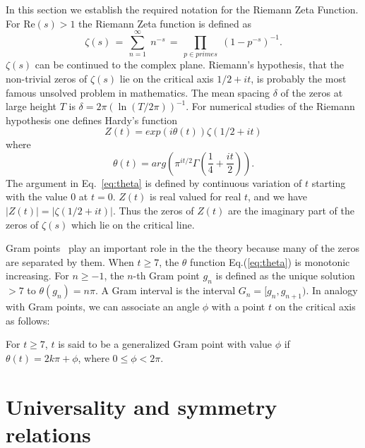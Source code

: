 \documentclass[twoside]{article}
\begin{document}
In this section we  establish the required notation for the 
Riemann Zeta Function. 
For $\mathrm{Re} (s) > 1$ the Riemann Zeta function is defined as
\begin{equation}
\zeta ( s ) \, = \, \sum^{\infty}_{n = 1} \; n^{-s} \, = \, \prod_{p \in primes} \;
\left( 1 - p^{-s} \right)^{-1}.
\label{eqRie}
\end{equation}
 $\zeta ( s )$ can be continued to
the complex plane. Riemann's hypothesis, that the non-trivial zeros of $\zeta ( s )$ lie on the 
critical axis $1/2+it$, is probably the most famous unsolved problem in mathematics.
The mean spacing $\delta$ of the zeros  at large height $T$ is $\delta = 2\pi(\ln (T/2\pi))^{-1}$. 
For numerical studies of the Riemann hypothesis one defines Hardy's function
\begin{equation}
Z(t)=exp(i\theta(t))\zeta(1/2 +it) 
\label{eq:hardy}
\end{equation}
where 
\begin{equation}
\theta(t) = arg (\pi^{it/2} \Gamma(\frac{1}{4} + \frac{it}{2})). 
\label{eq:theta}
\end{equation}
The argument in Eq.~\ref{eq:theta} is defined by continuous variation of $t$ starting with the value $0$ at $t = 0$.
$Z(t)$ is real valued for real $t$,
and we have $|Z(t)| = |\zeta(1/2+it)|$. Thus the zeros of $Z(t)$ are the imaginary part of the zeros 
of $\zeta(s)$ which lie on the critical line.  

Gram points~\cite{Gram 1903} play an important role in the the theory because many of the zeros are separated by them.  When $t \ge 7$, the $\theta$ function Eq.(\ref{eq:theta}) is monotonic increasing. 
For $n \ge -1$, the $n$-th Gram point $g_n$ is defined as the unique solution $> 7$ to
$\theta (g_n) = n\pi$. A Gram interval is the interval $G_n = [g_n,g_{n+1})$.
 In analogy with Gram points, we can associate an angle $\phi$ with a point $t$ on the critical axis as follows:
\begin{definition}\label{phi}
For $t \ge 7$, $t$ is said to be a generalized Gram point with value $\phi$  if
$\theta (t) = 2k\pi + \phi$, where $0 \le \phi < 2\pi$.
\end{definition}



\section{\label{sec3}Universality and symmetry relations}
\end{document}
